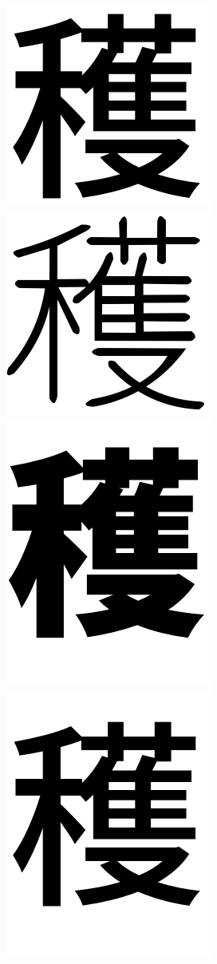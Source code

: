 \documentclass[10pt,twocolumn,letterpaper]{article}
\begin{document}
\begin{figure}[t]
    \centering
    \includegraphics[width=0.4\columnwidth]{../data/kanji-Boku2/kanji_225.png}
    \includegraphics[width=0.4\columnwidth]{../data/kanji-Chigfont/kanji_225.png}
    \includegraphics[width=0.4\columnwidth]{../data/kanji-GenEiHeavy/kanji_225.png}
    \includegraphics[width=0.4\columnwidth]{../data/kanji-GenEiSemiBold/kanji_225.png}

\end{figure}
\end{document}
